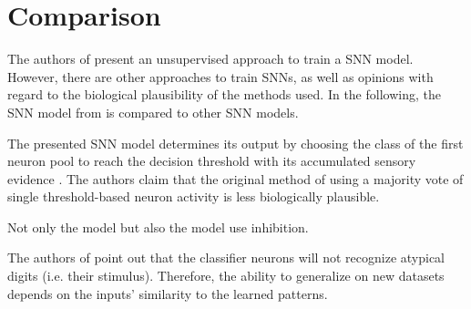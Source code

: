 \section{Comparison}
\label{sec:comparison}

The authors of \cite{SNN}  present an unsupervised approach to train a \ac{SNN} model.
However, there are other approaches to train \acp{SNN}, as well as opinions with regard to the biological plausibility of the methods used.
In the following, the \ac{SNN} model from \cite{SNN} is compared to other \ac{SNN} models.


The presented \ac{SNN} model determines its output by 
choosing the class of the first neuron pool to reach the decision threshold with its accumulated sensory evidence \cite{STDP_like}.
The authors claim that the original method of using a majority vote of single threshold-based neuron activity is less biologically plausible.

Not only the \cite{STDP_like} model but also the \cite{SNN} model use inhibition.

The authors of \cite{STDP_like} point out that the classifier neurons will not recognize atypical digits (i.e. their stimulus).
Therefore, the ability to generalize on new datasets depends on the inputs' similarity to the learned patterns.





